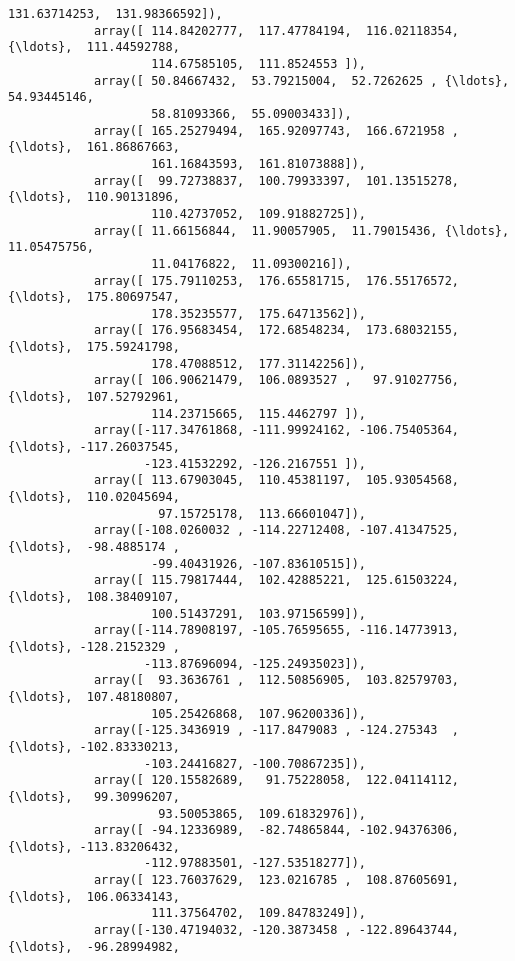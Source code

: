 \documentclass[11pt]{article}
\begin{document}
\begin{Verbatim}[commandchars=\\\{\}]
                    131.63714253,  131.98366592]),
            array([ 114.84202777,  117.47784194,  116.02118354, {\ldots},  111.44592788,
                    114.67585105,  111.8524553 ]),
            array([ 50.84667432,  53.79215004,  52.7262625 , {\ldots},  54.93445146,
                    58.81093366,  55.09003433]),
            array([ 165.25279494,  165.92097743,  166.6721958 , {\ldots},  161.86867663,
                    161.16843593,  161.81073888]),
            array([  99.72738837,  100.79933397,  101.13515278, {\ldots},  110.90131896,
                    110.42737052,  109.91882725]),
            array([ 11.66156844,  11.90057905,  11.79015436, {\ldots},  11.05475756,
                    11.04176822,  11.09300216]),
            array([ 175.79110253,  176.65581715,  176.55176572, {\ldots},  175.80697547,
                    178.35235577,  175.64713562]),
            array([ 176.95683454,  172.68548234,  173.68032155, {\ldots},  175.59241798,
                    178.47088512,  177.31142256]),
            array([ 106.90621479,  106.0893527 ,   97.91027756, {\ldots},  107.52792961,
                    114.23715665,  115.4462797 ]),
            array([-117.34761868, -111.99924162, -106.75405364, {\ldots}, -117.26037545,
                   -123.41532292, -126.2167551 ]),
            array([ 113.67903045,  110.45381197,  105.93054568, {\ldots},  110.02045694,
                     97.15725178,  113.66601047]),
            array([-108.0260032 , -114.22712408, -107.41347525, {\ldots},  -98.4885174 ,
                    -99.40431926, -107.83610515]),
            array([ 115.79817444,  102.42885221,  125.61503224, {\ldots},  108.38409107,
                    100.51437291,  103.97156599]),
            array([-114.78908197, -105.76595655, -116.14773913, {\ldots}, -128.2152329 ,
                   -113.87696094, -125.24935023]),
            array([  93.3636761 ,  112.50856905,  103.82579703, {\ldots},  107.48180807,
                    105.25426868,  107.96200336]),
            array([-125.3436919 , -117.8479083 , -124.275343  , {\ldots}, -102.83330213,
                   -103.24416827, -100.70867235]),
            array([ 120.15582689,   91.75228058,  122.04114112, {\ldots},   99.30996207,
                     93.50053865,  109.61832976]),
            array([ -94.12336989,  -82.74865844, -102.94376306, {\ldots}, -113.83206432,
                   -112.97883501, -127.53518277]),
            array([ 123.76037629,  123.0216785 ,  108.87605691, {\ldots},  106.06334143,
                    111.37564702,  109.84783249]),
            array([-130.47194032, -120.3873458 , -122.89643744, {\ldots},  -96.28994982,

\end{Verbatim}
\end{document}

